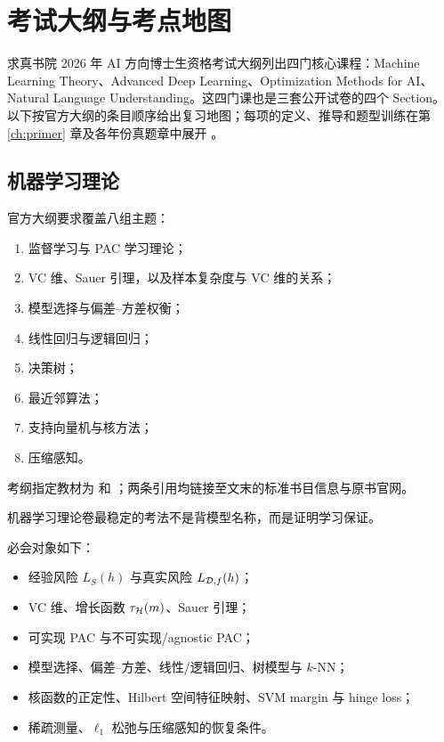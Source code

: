 \chapter{考试大纲与考点地图}
\label{ch:syllabus}

求真书院 2026 年 AI 方向博士生资格考试大纲列出四门核心课程：Machine Learning Theory、Advanced Deep Learning、Optimization Methods for AI、Natural Language Understanding。这四门课也是三套公开试卷的四个 Section。以下按官方大纲的条目顺序给出复习地图；每项的定义、推导和题型训练在第 \ref{ch:primer} 章及各年份真题章中展开 \parencite{qzc-ai-syllabus-2026}。



\section{机器学习理论}

官方大纲要求覆盖八组主题：

\begin{enumerate}
  \item 监督学习与 PAC 学习理论；
  \item VC 维、Sauer 引理，以及样本复杂度与 VC 维的关系；
  \item 模型选择与偏差--方差权衡；
  \item 线性回归与逻辑回归；
  \item 决策树；
  \item 最近邻算法；
  \item 支持向量机与核方法；
  \item 压缩感知。
\end{enumerate}

考纲指定教材为 \textcite{shalev2014uml} 和 \textcite{mohri2018foundations}；两条引用均链接至文末的标准书目信息与原书官网。

机器学习理论卷最稳定的考法不是背模型名称，而是证明学习保证。

必会对象如下：

\begin{itemize}
  \item 经验风险 \(L_S(h)\) 与真实风险 \(L_{\mathcal{D},f}(h)\)；
  \item VC 维、增长函数 \(\tau_{\mathcal{H}}(m)\)、Sauer 引理；
  \item 可实现 PAC 与不可实现/agnostic PAC；
  \item 模型选择、偏差--方差、线性/逻辑回归、树模型与 \(k\)-NN；
  \item 核函数的正定性、Hilbert 空间特征映射、SVM margin 与 hinge loss；
  \item 稀疏测量、\(\ell_1\) 松弛与压缩感知的恢复条件。
\end{itemize}

